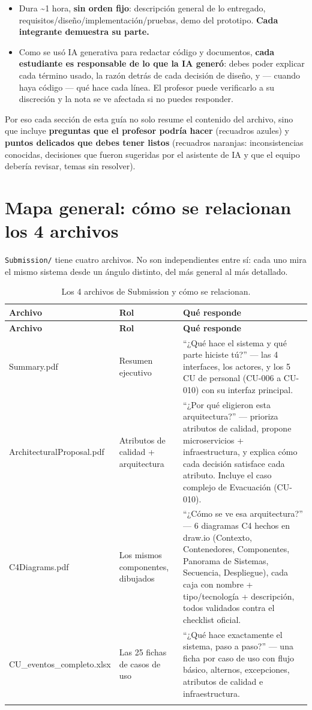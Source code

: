 \documentclass[12pt,a4paper]{article}
\begin{document}
\begin{itemize}
\item Dura \textasciitilde 1 hora, \textbf{sin orden fijo}: descripción general de lo entregado,
requisitos/diseño/implementación/pruebas, demo del prototipo. \textbf{Cada integrante demuestra su
parte.}
\item Como se usó IA generativa para redactar código y documentos, \textbf{cada estudiante es
responsable de lo que la IA generó}: debes poder explicar cada término usado, la razón detrás de
cada decisión de diseño, y --- cuando haya código --- qué hace cada línea. El profesor puede
verificarlo a su discreción y la nota se ve afectada si no puedes responder.
\end{itemize}

Por eso cada sección de esta guía no solo resume el contenido del archivo, sino que incluye
\textbf{preguntas que el profesor podría hacer} (recuadros azules) y \textbf{puntos delicados que
debes tener listos} (recuadros naranjas: inconsistencias conocidas, decisiones que fueron
sugeridas por el asistente de IA y que el equipo debería revisar, temas sin resolver).

\section{Mapa general: cómo se relacionan los 4 archivos}

\texttt{Submission/} tiene cuatro archivos. No son independientes entre sí: cada uno mira el mismo
sistema desde un ángulo distinto, del más general al más detallado.

\begin{longtable}{p{3cm}p{3.3cm}p{7.5cm}}
\toprule
\textbf{Archivo} & \textbf{Rol} & \textbf{Qué responde}\\
\midrule
\endfirsthead
\toprule
\textbf{Archivo} & \textbf{Rol} & \textbf{Qué responde}\\
\midrule
\endhead
Summary.pdf & Resumen ejecutivo & ``¿Qué hace el sistema y qué parte hiciste tú?'' --- las 4
interfaces, los actores, y los 5 CU de personal (CU-006 a CU-010) con su interfaz principal.\\[0.4em]
ArchitecturalProposal.pdf & Atributos de calidad + arquitectura & ``¿Por qué eligieron esta
arquitectura?'' --- prioriza atributos de calidad, propone microservicios + infraestructura, y
explica cómo cada decisión satisface cada atributo. Incluye el caso complejo de Evacuación
(CU-010).\\[0.4em]
C4Diagrams.pdf & Los mismos componentes, dibujados & ``¿Cómo se ve esa arquitectura?'' --- 6
diagramas C4 hechos en draw.io (Contexto, Contenedores, Componentes, Panorama de Sistemas,
Secuencia, Despliegue), cada caja con nombre + tipo/tecnología + descripción, todos validados
contra el checklist oficial.\\[0.4em]
CU\_eventos\_completo.xlsx & Las 25 fichas de casos de uso & ``¿Qué hace exactamente el sistema,
paso a paso?'' --- una ficha por caso de uso con flujo básico, alternos, excepciones, atributos de
calidad e infraestructura.\\
\bottomrule
\caption{Los 4 archivos de Submission y cómo se relacionan.}
\end{longtable}
\end{document}
